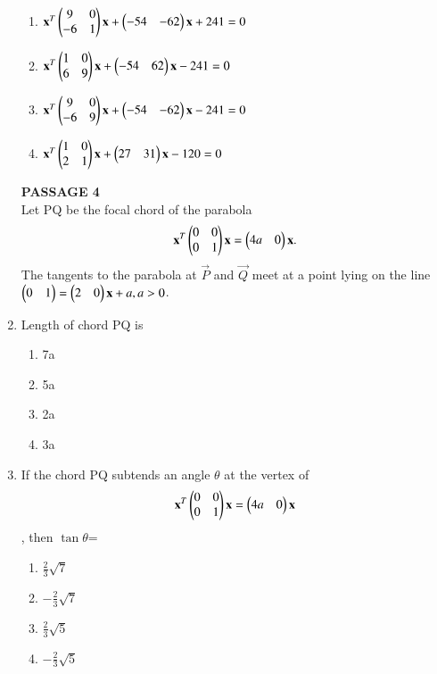 \begin{enumerate}[label=\arabic*.,ref=\thesubsection.\theenumi]
    \begin{enumerate}
    \item $\mathbf{x}^T\begin{pmatrix}9&0\\-6&1\end{pmatrix}\mathbf{x}+\begin{pmatrix}-54&-62\end{pmatrix}\mathbf{x}+241=0$
    \item $\mathbf{x}^T\begin{pmatrix}1&0\\6&9\end{pmatrix}\mathbf{x}+\begin{pmatrix}-54&62\end{pmatrix}\mathbf{x}-241=0$
    \item $\mathbf{x}^T\begin{pmatrix}9&0\\-6&9\end{pmatrix}\mathbf{x}+\begin{pmatrix}-54&-62\end{pmatrix}\mathbf{x}-241=0$
    \item $\mathbf{x}^T\begin{pmatrix}1&0\\2&1\end{pmatrix}\mathbf{x}+\begin{pmatrix}27&31\end{pmatrix}\mathbf{x}-120=0$
    \end{enumerate}
    \textbf{PASSAGE 4}\\
    Let PQ be the focal chord of the parabola
    \begin{align}
    \mathbf{x}^T\begin{pmatrix}0&0\\0&1\end{pmatrix}\mathbf{x}=\begin{pmatrix}4a&0\end{pmatrix}\mathbf{x}.
    \end{align} The tangents to the parabola at $\vec{P}$ and $\vec{Q}$ meet at a point lying on the 		line $\begin{pmatrix}0&1\end{pmatrix}=\begin{pmatrix}2&0\end{pmatrix}\mathbf{x}+a, a>0$.
    \item Length of chord PQ is 
    \begin{enumerate}
    \item 7a
    \item 5a
    \item 2a
    \item 3a
    \end{enumerate}
    \item If the chord PQ subtends an angle $\theta$ at the vertex of
    \begin{align}
    \mathbf{x}^T\begin{pmatrix}0&0\\0&1\end{pmatrix}\mathbf{x}=\begin{pmatrix}4a&0\end{pmatrix}\mathbf{x}
    \end{align}, then $\tan\theta$=
    \begin{enumerate}
    \item $\frac{2}{3}\sqrt{7}$
    \item $-\frac{2}{3}\sqrt{7}$
    \item $\frac{2}{3}\sqrt{5}$
    \item $-\frac{2}{3}\sqrt{5}$
    \end{enumerate}


\end{enumerate}
